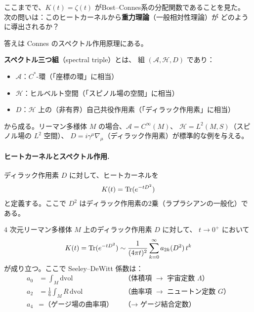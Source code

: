 ここまでで、$K(t) = \zeta(t)$ がBost--Connes系の分配関数であることを見た。
次の問いは：このヒートカーネルから\textbf{重力理論}（一般相対性理論）が
どのように導出されるか？

答えは Connes のスペクトル作用原理にある。

\begin{definition}[スペクトル三つ組]
\label{def:spectral-triple}
\textbf{スペクトル三つ組}（spectral triple）とは、
組 $(\mathcal{A}, \mathcal{H}, D)$ であり：
\begin{itemize}
  \item $\mathcal{A}$：$C^*$-環（「座標の環」に相当）
  \item $\mathcal{H}$：ヒルベルト空間（「スピノル場の空間」に相当）
  \item $D$：$\mathcal{H}$ 上の（非有界）自己共役作用素（「ディラック作用素」に相当）
\end{itemize}
から成る。リーマン多様体 $M$ の場合、$\mathcal{A} = C^{\infty}(M)$、
$\mathcal{H} = L^2(M, S)$（スピノル場の $L^2$ 空間）、
$D = i\gamma^{\mu}\nabla_{\mu}$（ディラック作用素）が標準的な例を与える。
\end{definition}

\paragraph{ヒートカーネルとスペクトル作用.}
ディラック作用素 $D$ に対して、ヒートカーネルを
\begin{equation}
  K(t) = \operatorname{Tr}(e^{-t D^2})
  \label{eq:heat-kernel-D}
\end{equation}
と定義する。ここで $D^2$ はディラック作用素の2乗（ラプラシアンの一般化）である。

\begin{theorem}
\label{thm:seeley-dewitt}
$4$ 次元リーマン多様体 $M$ 上のディラック作用素 $D$ に対して、
$t \to 0^+$ において
\begin{equation}
  K(t) = \operatorname{Tr}(e^{-tD^2}) \sim \frac{1}{(4\pi t)^2}
  \sum_{k=0}^{\infty} a_{2k}(D^2)\, t^k
  \label{eq:seeley-dewitt}
\end{equation}
が成り立つ。ここで Seeley--DeWitt 係数は：
\begin{align}
  a_0 &= \int_M \mathrm{dvol} & &\text{（体積項 $\to$ 宇宙定数 $\Lambda$）} \\
  a_2 &= \frac{1}{6} \int_M R\, \mathrm{dvol} & &\text{（曲率項 $\to$ ニュートン定数 $G$）} \\
  a_4 &= \text{（ゲージ場の曲率項）} & &\text{（$\to$ ゲージ結合定数）}
\end{align}
\end{theorem}

